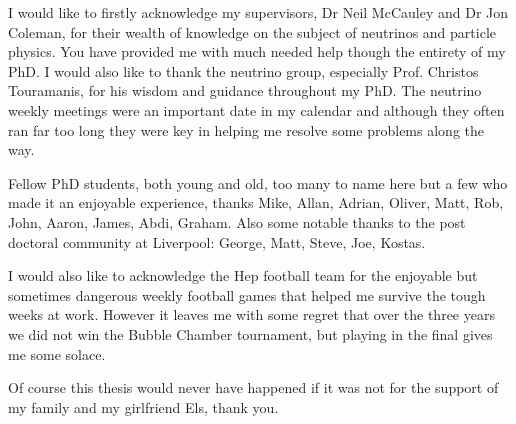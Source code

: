 \begin{acknowledgements}
I would like to firstly acknowledge my supervisors, Dr Neil McCauley and Dr Jon Coleman, for their wealth of knowledge on the subject of neutrinos and particle physics. You have provided me with much needed help though the entirety of my PhD. I would also like to thank the neutrino group, especially Prof. Christos Touramanis, for his wisdom and guidance throughout my PhD. The neutrino weekly meetings were an important date in my calendar and although they often ran far too long they were key in helping me resolve some problems along the way.

Fellow PhD students, both young and old, too many to name here but a few who made it an enjoyable experience, thanks Mike, Allan, Adrian, Oliver, Matt, Rob, John, Aaron, James, Abdi, Graham. Also some notable thanks to the post doctoral community at Liverpool: George, Matt, Steve, Joe, Kostas.

I would also like to acknowledge the Hep football team for the enjoyable but sometimes dangerous weekly football games that helped me survive the tough weeks at work. However it leaves me with some regret that over the three years we did not win the Bubble Chamber tournament, but playing in the final gives me some solace.

Of course this thesis would never have happened if it was not for the support of my family and my girlfriend Els, thank you.

\end{acknowledgements}
